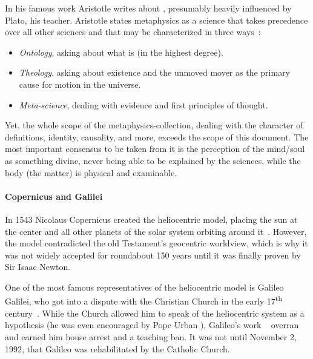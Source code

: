 In his famous work  Aristotle writes about , presumably heavily influenced by Plato, his teacher.
Aristotle states metaphysics as a science that takes precedence over all other sciences and that may be characterized in three ways~\cite{aristotle350}:
\begin{itemize}
    \item \emph{Ontology}, asking about what  is (in the highest degree).
    \item \emph{Theology}, asking about existence and the unmoved mover as the primary cause for motion in the universe.
    \item \emph{Meta-science}, dealing with evidence and first principles of thought.
\end{itemize}
Yet, the whole scope of the metaphysics-collection, dealing with the character of definitions, identity, causality, and more, exceeds the scope of this document.
The most important consensus to be taken from it is the perception of the \mbox{mind/soul} as something divine, never being able to be explained by the sciences,
while the body (the matter) is physical and examinable.


\paragraph{Copernicus and Galilei} In 1543 Nicolaus Copernicus created the heliocentric model, placing the sun at the center and all other planets of the solar system orbiting around it~\cite{copernicus1965revolutionibus}.
However, the model contradicted the old Testament's geocentric worldview, which is why it was not widely accepted for roundabout 150 years until it was finally proven by Sir Isaac Newton.

One of the most famous representatives of the heliocentric model is Galileo Galilei, who got into a dispute with the Christian Church in the early 17\textsuperscript{th} century~\cite{folsing1983galileo}.
While the Church allowed him to speak of the heliocentric system as a hypothesis (he was even encouraged by Pope Urban ), Galileo's work ~\cite{galilei1632dialogo} overran and earned him house arrest and a teaching ban.
It was not until November 2, 1992, that Galileo was rehabilitated by the Catholic Church.


